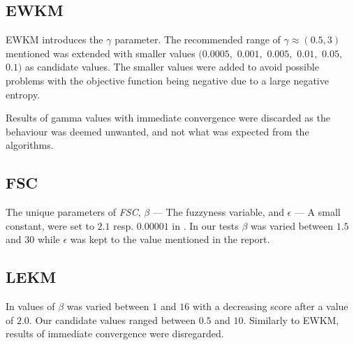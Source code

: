 \documentclass[../report.tex]{subfiles}
\begin{document}




\subsection{EWKM}
EWKM introduces the $\gamma$ parameter. The recommended range of $\gamma \approx (0.5, 3)$ mentioned \cite{Jing2007, wskm2014hz} was extended with smaller values $(0.0005,$ $0.001,$ $0.005,$ $0.01,$ $0.05,$ $0.1)$ as candidate values. The smaller values were added to avoid possible problems with the objective function being negative due to a large negative entropy.

Results of gamma values with immediate convergence were discarded as the behaviour was deemed unwanted, and not what was expected from the algorithms.

\subsection{FSC}
The unique parameters of \textit{FSC}, $\beta$ --- The fuzzyness variable, and $\epsilon$ --- A small constant, were set to $2.1$ resp. $0.00001$ in \cite{Gan2006}. In our tests $\beta$ was varied between $1.5$ and $30$ while $\epsilon$ was kept to the value mentioned in the report.

\subsection{LEKM}
In \cite{Gan2016} values of $\beta$ was varied between $1$ and $16$ with a decreasing score after a value of $2.0$. Our candidate values ranged between $0.5$ and $10$. Similarly to EWKM, results of immediate convergence were disregarded.
\end{document}
